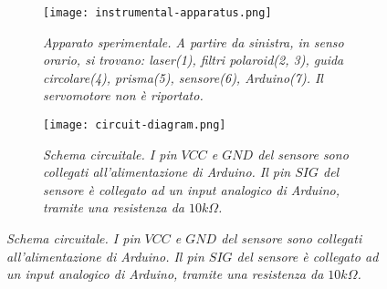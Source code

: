 \documentclass[12pt, a4paper, twoside]{article}
\begin{document}
    \begin{figure}[h]
      \centering
      \caption{Apparato sperimentale e schema circuitale.}
      \begin{subfigure}{.4\textwidth}
        \texttt{[image: instrumental-apparatus.png]}
        \caption{
          \emph{
            Apparato sperimentale. A partire da sinistra, in senso orario,
            si trovano: laser(1), filtri polaroid(2, 3), guida circolare(4),
            prisma(5), sensore(6), Arduino(7). Il servomotore non è riportato.
          }
        }
        \label{fig:instrumental-apparatus}
      \end{subfigure}%
      \hspace{20mm}
      \begin{subfigure}{.4\textwidth}
        \texttt{[image: circuit-diagram.png]}
        \caption{
          \emph{
            Schema circuitale. I pin $VCC$ e $GND$ del sensore sono collegati
            all'alimentazione di Arduino. Il pin $SIG$
            del sensore è collegato ad un input analogico di Arduino, tramite una
            resistenza da $10k\Omega$.
          }
        }
        \label{fig:circuit-diagram}
      \end{subfigure}
    \end{figure}
\end{document}
